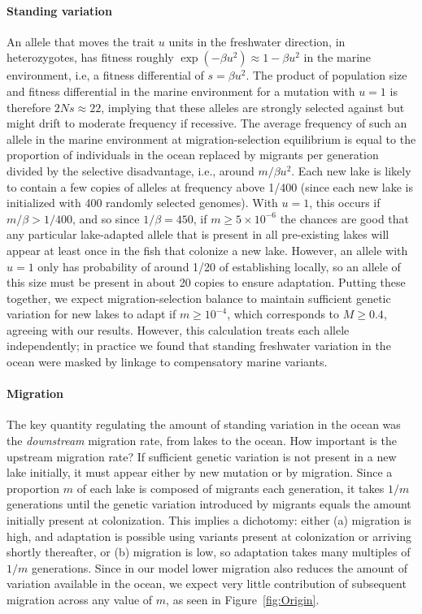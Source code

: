 \documentclass{article}
\begin{document}
\paragraph{Standing variation}
An allele that moves the trait $u$ units in the freshwater direction, in heterozygotes, has fitness roughly $\exp(-\beta u^2) \approx 1 - \beta u^2$ in the marine environment, i.e, a fitness differential of $s = \beta u^2$. The product of population size and fitness differential in the marine environment for a mutation with $u=1$ is therefore $2Ns \approx 22$, implying that these alleles are strongly selected against but might drift to moderate frequency if recessive. The average frequency of such an allele in the marine environment at migration-selection equilibrium is equal to the proportion of individuals in the ocean replaced by migrants per generation divided by the selective disadvantage, i.e., around $m / \beta u^2$. 
Each new lake is likely to contain a few copies of alleles at frequency above 1/400 (since each new lake is initialized with 400 randomly selected genomes). With $u=1$, this occurs if $m/\beta > 1/400$,
and so since $1/\beta = 450$, if $m \ge 5 \times 10^{-6}$ the chances are good that any particular lake-adapted allele that is present in all pre-existing lakes will appear at least once in the fish that colonize a new lake. However, an allele with $u=1$ only has probability of around 1/20 of establishing locally, so an allele of this size must be present in about 20 copies to ensure adaptation. Putting these together, we expect migration-selection balance to maintain sufficient genetic variation for new lakes to adapt if $m \ge 10^{-4}$, which corresponds to $M \ge 0.4$,
agreeing with our results.
However, this calculation treats each allele independently; in practice we found that standing freshwater variation in the ocean were masked by linkage to compensatory marine variants.

\paragraph{Migration}
The key quantity regulating the amount of standing variation in the ocean was the \emph{downstream} migration rate, from lakes to the ocean. How important is the upstream migration rate?
If sufficient genetic variation is not present in a new lake initially, it must appear either by new mutation or by migration. Since a proportion $m$ of each lake is composed of migrants each generation, 
it takes $1/m$ generations until the genetic variation introduced by migrants equals the amount initially present at colonization. This implies a dichotomy: either (a) migration is high, and adaptation is possible using variants present at colonization or arriving shortly thereafter, or (b) migration is low, so adaptation takes many multiples of $1/m$ generations. Since in our model lower migration also reduces the amount of variation available in the ocean, we expect very little contribution of subsequent migration across any value of $m$, as seen in Figure~\ref{fig:Origin}.
\end{document}
